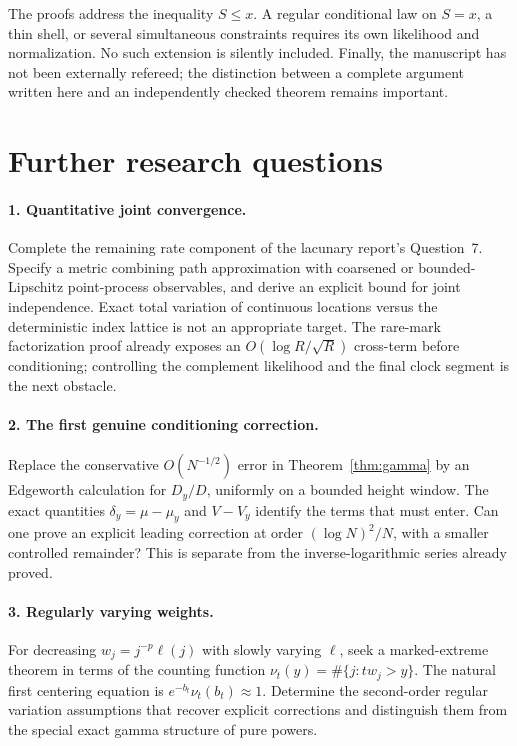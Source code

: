 \documentclass[11pt,a4paper]{article}
\numberwithin{equation}{section}
\theoremstyle{definition}
\theoremstyle{remark}
\begin{document}
The proofs address the inequality $S\le x$. A regular conditional law
on $S=x$, a thin shell, or several simultaneous constraints requires
its own likelihood and normalization. No such extension is silently
included. Finally, the manuscript has not been externally refereed;
the distinction between a complete argument written here and an
independently checked theorem remains important.

\section{Further research questions}
\label{sec:questions}

\paragraph{1. Quantitative joint convergence.}
Complete the remaining rate component of the lacunary report's
Question~7. Specify a metric combining path approximation with
coarsened or bounded-Lipschitz point-process observables, and derive
an explicit bound for joint independence. Exact total variation of
continuous locations versus the deterministic index lattice is not an
appropriate target. The rare-mark factorization proof already exposes
an $O(\log R/\sqrt R)$ cross-term before conditioning; controlling the
complement likelihood and the final clock segment is the next obstacle.

\paragraph{2. The first genuine conditioning correction.}
Replace the conservative $O(N^{-1/2})$ error in
Theorem~\ref{thm:gamma} by an Edgeworth calculation for $D_y/D$,
uniformly on a bounded height window. The exact quantities
$\delta_y=\mu-\mu_y$ and $V-V_y$ identify the terms that must enter.
Can one prove an explicit leading correction at order
$(\log N)^2/N$, with a smaller controlled remainder? This is separate
from the inverse-logarithmic series already proved.

\paragraph{3. Regularly varying weights.}
For decreasing $w_j=j^{-p}\ell(j)$ with slowly varying $\ell$, seek
a marked-extreme theorem in terms of the counting function
$\nu_t(y)=\#\{j:tw_j>y\}$. The natural first centering equation is
$e^{-b_t}\nu_t(b_t)\approx1$. Determine the second-order regular
variation assumptions that recover explicit corrections and distinguish
them from the special exact gamma structure of pure powers.
\end{document}

